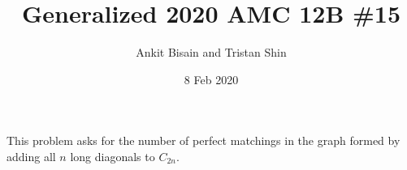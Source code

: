 \documentclass[letter, 12pt]{article}
\title{Generalized 2020 AMC 12B \#15}
\author{Ankit Bisain and Tristan Shin}
\date{8 Feb 2020}
\begin{document}
\maketitle


\hrulefill

\begin{solution}
\end{solution}
\begin{remark}
	This problem asks for the number of perfect matchings in the graph formed by adding all $n$ long diagonals to $C_{2n}$.
\end{remark}
\end{document}
